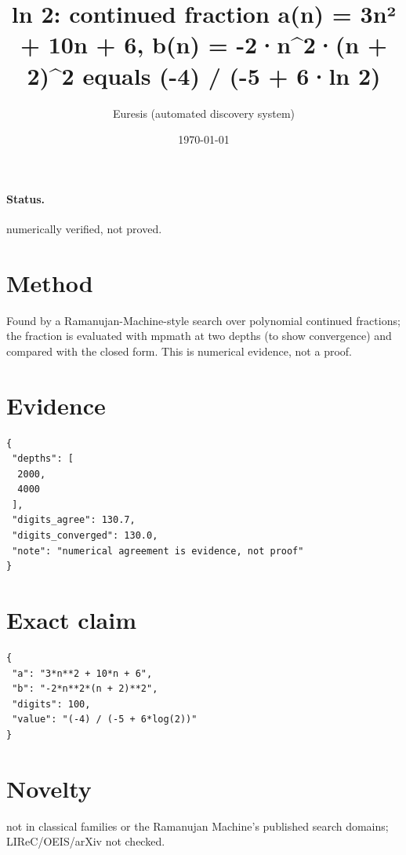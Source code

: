 \documentclass[11pt]{article}
\title{ln 2: continued fraction a(n) = 3n² + 10n + 6, b(n) = -2·n\^{}2·(n + 2)\^{}2 equals (-4) / (-5 + 6·ln 2)}
\author{Euresis (automated discovery system)}
\date{\today}
\begin{document}
\maketitle
\paragraph{Status.} numerically verified, not proved.
\section{Method}
Found by a Ramanujan-Machine-style search over polynomial continued fractions; the fraction is evaluated with mpmath at two depths (to show convergence) and compared with the closed form. This is numerical evidence, not a proof.
\section{Evidence}
\begin{verbatim}
{
 "depths": [
  2000,
  4000
 ],
 "digits_agree": 130.7,
 "digits_converged": 130.0,
 "note": "numerical agreement is evidence, not proof"
}
\end{verbatim}
\section{Exact claim}
\begin{verbatim}
{
 "a": "3*n**2 + 10*n + 6",
 "b": "-2*n**2*(n + 2)**2",
 "digits": 100,
 "value": "(-4) / (-5 + 6*log(2))"
}
\end{verbatim}
\section{Novelty}
not in classical families or the Ramanujan Machine's published search domains; LIReC/OEIS/arXiv not checked.
\end{document}

